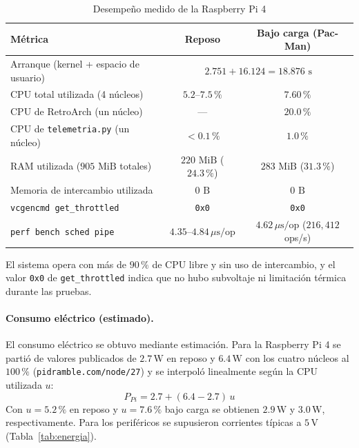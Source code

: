 \begin{table}[H]
	\centering
	\caption{Desempeño medido de la Raspberry Pi 4}
	\label{tab:desempeno_pi}
	\footnotesize
	\begin{tabular}{|l|c|c|}
		\hline
		\textbf{Métrica} & \textbf{Reposo} & \textbf{Bajo carga (Pac-Man)} \\
		\hline
		Arranque (kernel + espacio de usuario) & \multicolumn{2}{c|}{$2.751 + 16.124 = 18.876\text{ s}$} \\
		\hline
		CPU total utilizada (4 núcleos) & $5.2$--$7.5\,\%$ & $7.60\,\%$ \\
		\hline
		CPU de RetroArch (un núcleo) & --- & $20.0\,\%$ \\
		\hline
		CPU de \texttt{telemetria.py} (un núcleo) & $<0.1\,\%$ & $1.0\,\%$ \\
		\hline
		RAM utilizada ($905\text{ MiB}$ totales) & $220\text{ MiB}$ ($24.3\,\%$) & $283\text{ MiB}$ ($31.3\,\%$) \\
		\hline
		Memoria de intercambio utilizada & $0\text{ B}$ & $0\text{ B}$ \\
		\hline
		\texttt{vcgencmd get\_throttled} & \texttt{0x0} & \texttt{0x0} \\
		\hline
		\texttt{perf bench sched pipe} & $4.35$--$4.84\,\mu\text{s/op}$ & $4.62\,\mu\text{s/op}$ ($216{,}412$ ops/s) \\
		\hline
	\end{tabular}
\end{table}

El sistema opera con más de $90\,\%$ de CPU libre y sin uso de intercambio, y el valor \texttt{0x0} de \texttt{get\_throttled} indica que no hubo subvoltaje ni limitación térmica durante las pruebas.

\paragraph{Consumo eléctrico (estimado).}
El consumo eléctrico se obtuvo mediante estimación. Para la Raspberry Pi 4 se partió de valores publicados de $2.7\,\mathrm{W}$ en reposo y $6.4\,\mathrm{W}$ con los cuatro núcleos al $100\,\%$ (\texttt{pidramble.com/node/27}) y se interpoló linealmente según la CPU utilizada $u$:
\begin{equation}
P_{Pi} = 2.7 + (6.4 - 2.7)\,u
\end{equation}
Con $u = 5.2\,\%$ en reposo y $u = 7.6\,\%$ bajo carga se obtienen $2.9\,\mathrm{W}$ y $3.0\,\mathrm{W}$, respectivamente. Para los periféricos se supusieron corrientes típicas a $5\,\mathrm{V}$ (Tabla~\ref{tab:energia}).

